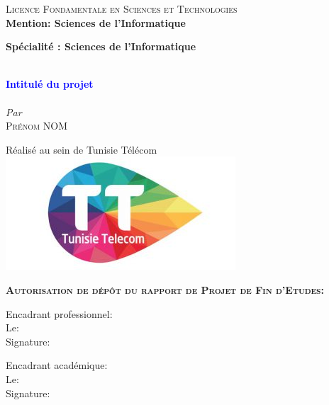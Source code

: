 \begin{titlepage}
\textsc{\large Licence Fondamentale en Sciences et Technologies}\\[0.5cm] %

\textbf{Mention: Sciences de l'Informatique}

\textbf{Spécialité : Sciences de l'Informatique}

\vskip1cm%


\HRule \\[0.4cm]
\textcolor{blue}{ \LARGE \bfseries Intitulé du projet}\\[0.4cm] %
\HRule \\[1cm]

\vskip0.5cm%
\textit{Par}\\
\textsc{\large Prénom NOM}\\[0.5cm] %
\vskip0.5cm%

{Réalisé au sein de Tunisie Télécom}\\
\includegraphics[width=0.2\columnwidth]{tt-logo.jpg}\\

\vskip1cm
 


 \begin{flushleft}
\textbf{\textsc{Autorisation de dépôt du rapport de Projet de Fin d'Etudes:}}\\[0.5cm] %
\vskip0.5cm
\begin{minipage}[c]{0.3\columnwidth}
Encadrant professionnel:\\
\vskip0.5cm
Le:\\
\vskip0.5cm
Signature:\\

\end{minipage}
\hfill
\begin{minipage}[c]{0.4\columnwidth}
Encadrant académique:\\
\vskip0.5cm
Le:\\
\vskip0.5cm
Signature:\\
\end{minipage}


\end{flushleft}
\end{titlepage}
